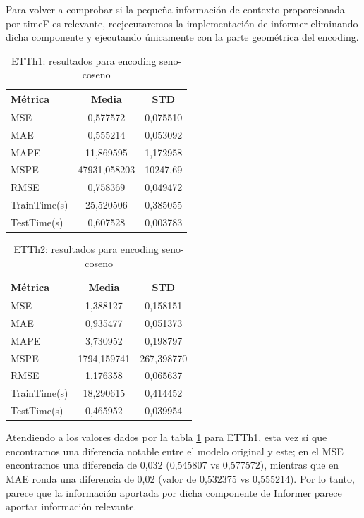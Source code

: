  Para volver a comprobar si la pequeña información de contexto proporcionada por timeF es relevante, reejecutaremos la implementación de informer eliminando dicha componente y ejecutando únicamente con la parte geométrica del encoding.\\
  
 \begin{table}[!ht]
 	\centering
 	\begin{tabular}{l|c|c}
 		\toprule
 		Métrica & Media & STD \\
 		\midrule
	 		MSE & 0,577572 & 0,075510 \\
		MAE & 0,555214 & 0,053092 \\
		MAPE & 11,869595 & 1,172958 \\
		MSPE & 47931,058203 & 10247,69 \\
		RMSE & 0,758369 & 0,049472 \\
		TrainTime(s) & 25,520506 & 0,385055 \\
		TestTime(s) & 0,607528 & 0,003783 \\
 		\bottomrule
 	\end{tabular}
 	\caption{ETTh1: resultados para encoding seno-coseno}
 	\label{etth1fixed}
 \end{table}
 
 
  
 \begin{table}[!ht]
 	\centering
 	\begin{tabular}{l|c|c}
 		\toprule
 		Métrica & Media & STD \\
 		\midrule
 		MSE & 1,388127 & 0,158151 \\
		MAE & 0,935477 & 0,051373 \\
		MAPE & 3,730952 & 0,198797 \\
		MSPE & 1794,159741 & 267,398770 \\
		RMSE & 1,176358 & 0,065637 \\
		TrainTime(s) & 18,290615 & 0,414452 \\
		TestTime(s) & 0,465952 & 0,039954 \\
 		\bottomrule
 	\end{tabular}
 	\caption{ETTh2: resultados para encoding seno-coseno}
 	\label{etth2fixed}
 \end{table}
 
  Atendiendo a los valores dados por la tabla \ref{etth1fixed} para ETTh1, esta vez sí que encontramos una diferencia notable entre el modelo original y este; en el MSE encontramos una diferencia de 0,032 (0,545807 vs 0,577572), mientras que en MAE ronda una diferencia de 0,02 (valor de 0,532375 vs 0,555214). Por lo tanto, parece que la información aportada por dicha componente de Informer parece aportar información relevante.\\
  
